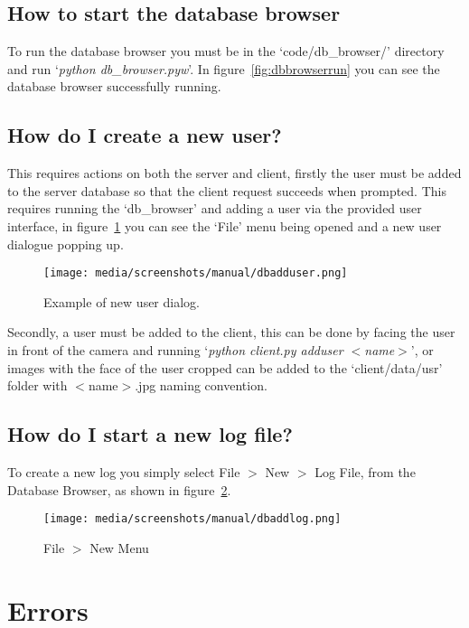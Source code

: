 \documentclass[12pt,a4paper]{report}
\begin{document}
    \subsection{How to start the database browser}
        To run the database browser you must be in the `code/db\_browser/' directory and run `\textit{python db\_browser.pyw}'. In figure~\ref{fig:dbbrowserrun} you can 
        see the database browser successfully running.

    \subsection{How do I create a new user?}
        This requires actions on both the server and client, firstly the user must be added to the server database so that the client request 
        succeeds when prompted. This requires running the `db\_browser' and adding a user via the provided user interface, in figure~\ref{fig:dbadduser}
        you can see the `File' menu being opened and a new user dialogue popping up.

        \begin{figure}[H]
            \centering
            \caption{Example of new user dialog.}
            \label{fig:dbadduser}
                \texttt{[image: media/screenshots/manual/dbadduser.png]}
        \end{figure}

        Secondly, a user must be added to the client, this can be done by facing the user in front of the camera and running `\textit{python client.py adduser $<$name$>$}',
        or images with the face of the user cropped can be added to the `client/data/usr' folder with $<$name$>$.jpg naming convention.
    \newpage
    \subsection{How do I start a new log file?}
        To create a new log you simply select File $>$ New $>$ Log File, from the Database Browser, as shown in figure~\ref{fig:dbaddlog}.

        \begin{figure}[H]
            \centering
            \caption{File $>$ New Menu}
            \label{fig:dbaddlog}
                \texttt{[image: media/screenshots/manual/dbaddlog.png]}
        \end{figure}        


\section{Errors}
\end{document}

